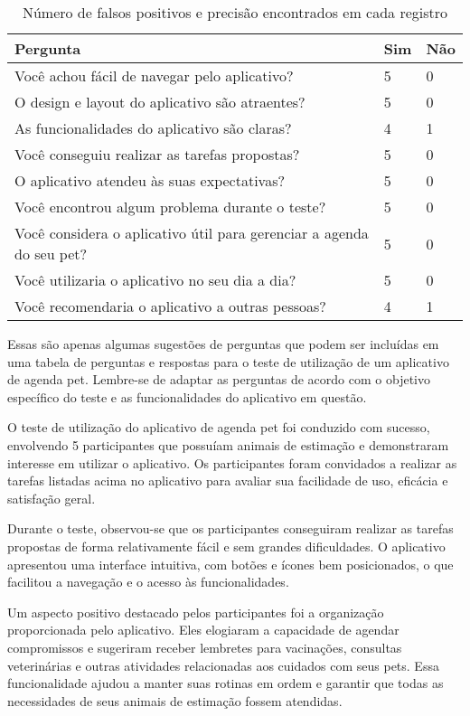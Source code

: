 \begin{table}[tbh]
\centering
\label{tab:falsos-positivos}
\begin{tabular}{l|l|l}
\textbf{Pergunta} & \textbf{Sim} & \textbf{Não} \\
\hline
Você achou fácil de navegar pelo aplicativo?  &  5 &  0 \\    
\hline
O design e layout do aplicativo são atraentes? &  5 &  0 \\   
\hline
As funcionalidades do aplicativo são claras?  & 4  &  1 \\    
\hline
Você conseguiu realizar as tarefas propostas?  & 5 & 0 \\  
\hline
O aplicativo atendeu às suas expectativas? & 5 & 0 \\    
\hline
Você encontrou algum problema durante o teste?  & 5 &  0 \\  
\hline
Você considera o aplicativo útil para gerenciar a agenda do seu pet? & 5 &  0 \\
\hline
Você utilizaria o aplicativo no seu dia a dia? & 5 &  0 \\  
\hline
Você recomendaria o aplicativo a outras pessoas? & 4 &  1 \\  
\end{tabular}
\caption{Número de falsos positivos e precisão encontrados em cada registro}
\end{table}


Essas são apenas algumas sugestões de perguntas que podem ser incluídas em uma tabela de perguntas e respostas para o teste de utilização de um aplicativo de agenda pet. Lembre-se de adaptar as perguntas de acordo com o objetivo específico do teste e as funcionalidades do aplicativo em questão.



O teste de utilização do aplicativo de agenda pet foi conduzido com sucesso, envolvendo 5 participantes que possuíam animais de estimação e demonstraram interesse em utilizar o aplicativo. Os participantes foram convidados a realizar as tarefas listadas acima no aplicativo para avaliar sua facilidade de uso, eficácia e satisfação geral.

Durante o teste, observou-se que os participantes conseguiram realizar as tarefas propostas de forma relativamente fácil e sem grandes dificuldades. O aplicativo apresentou uma interface intuitiva, com botões e ícones bem posicionados, o que facilitou a navegação e o acesso às funcionalidades.

Um aspecto positivo destacado pelos participantes foi a organização proporcionada pelo aplicativo. Eles elogiaram a capacidade de agendar compromissos e sugeriram receber lembretes para vacinações, consultas veterinárias e outras atividades relacionadas aos cuidados com seus pets. Essa funcionalidade ajudou a manter suas rotinas em ordem e garantir que todas as necessidades de seus animais de estimação fossem atendidas.

